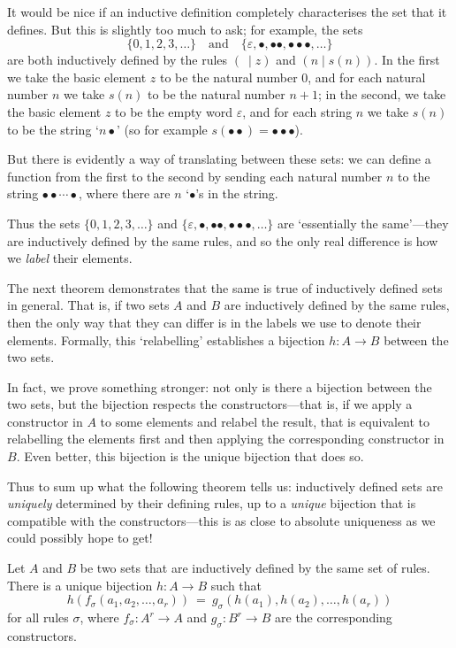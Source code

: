 It would be nice if an inductive definition completely characterises the set that it defines. But this is slightly too much to ask; for example, the sets
\[ \{ 0, 1, 2, 3, \dots \} \quad \text{and} \quad \{ \varepsilon, {\bullet}, {\bullet} {\bullet}, {\bullet} {\bullet} {\bullet}, \dots \} \]
are both inductively defined by the rules $(~ \mid z)$ and $(n \mid s(n))$. In the first we take the basic element $z$ to be the natural number $0$, and for each natural number $n$ we take $s(n)$ to be the natural number $n+1$; in the second, we take the basic element $z$ to be the empty word $\varepsilon$, and for each string $n$ we take $s(n)$ to be the string `$n {\bullet}$' (so for example $s({\bullet} {\bullet}) = {\bullet} {\bullet} {\bullet}$).

But there is evidently a way of translating between these sets: we can define a function from the first to the second by sending each natural number $n$ to the string ${\bullet} {\bullet} \cdots {\bullet}$, where there are $n$ `${\bullet}$'s in the string.

Thus the sets $\{ 0, 1, 2, 3, \dots \}$ and $\{ \varepsilon, {\bullet}, {\bullet}{\bullet}, {\bullet}{\bullet}{\bullet}, \dots \}$ are `essentially the same'---they are inductively defined by the same rules, and so the only real difference is how we \textit{label} their elements.

The next theorem demonstrates that the same is true of inductively defined sets in general. That is, if two sets $A$ and $B$ are inductively defined by the same rules, then the only way that they can differ is in the labels we use to denote their elements. Formally, this `relabelling' establishes a bijection $h : A \to B$ between the two sets.

In fact, we prove something stronger: not only is there a bijection between the two sets, but the bijection respects the constructors---that is, if we apply a constructor in $A$ to some elements and relabel the result, that is equivalent to relabelling the elements first and then applying the corresponding constructor in $B$. Even better, this bijection is the unique bijection that does so.

Thus to sum up what the following theorem tells us: inductively defined sets are \textit{uniquely} determined by their defining rules, up to a \textit{unique} bijection that is compatible with the constructors---this is as close to absolute uniqueness as we could possibly hope to get!

\begin{theorem}
\label{thmUniquenessOfInductivelyDefinedSets}
Let $A$ and $B$ be two sets that are inductively defined by the same set of rules. There is a unique bijection $h : A \to B$ such that
\[ h(f_{\sigma}(a_1,a_2,\dots,a_r)) ~=~ g_{\sigma}(h(a_1),h(a_2),\dots,h(a_r)) \]
for all rules $\sigma$, where $f_{\sigma} : A^r \to A$ and $g_{\sigma} : B^r \to B$ are the corresponding constructors.
\end{theorem}

